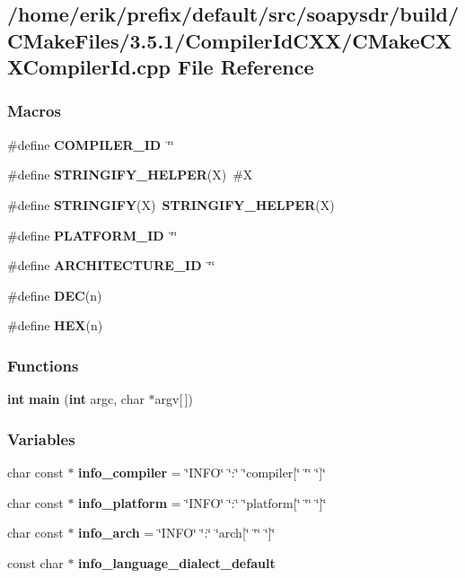 \subsection{/home/erik/prefix/default/src/soapysdr/build/\+C\+Make\+Files/3.5.1/\+Compiler\+Id\+C\+X\+X/\+C\+Make\+C\+X\+X\+Compiler\+Id.cpp File Reference}
\label{soapysdr_2build_2CMakeFiles_23_85_81_2CompilerIdCXX_2CMakeCXXCompilerId_8cpp}
\subsubsection*{Macros}
\begin{DoxyCompactItemize}
\item 
\#define {\bf C\+O\+M\+P\+I\+L\+E\+R\+\_\+\+ID}~\char`\"{}\char`\"{}
\item 
\#define {\bf S\+T\+R\+I\+N\+G\+I\+F\+Y\+\_\+\+H\+E\+L\+P\+ER}(X)~\#X
\item 
\#define {\bf S\+T\+R\+I\+N\+G\+I\+FY}(X)~{\bf S\+T\+R\+I\+N\+G\+I\+F\+Y\+\_\+\+H\+E\+L\+P\+ER}(X)
\item 
\#define {\bf P\+L\+A\+T\+F\+O\+R\+M\+\_\+\+ID}~\char`\"{}\char`\"{}
\item 
\#define {\bf A\+R\+C\+H\+I\+T\+E\+C\+T\+U\+R\+E\+\_\+\+ID}~\char`\"{}\char`\"{}
\item 
\#define {\bf D\+EC}(n)
\item 
\#define {\bf H\+EX}(n)
\end{DoxyCompactItemize}
\subsubsection*{Functions}
\begin{DoxyCompactItemize}
\item 
{\bf int} {\bf main} ({\bf int} argc, char $\ast$argv[$\,$])
\end{DoxyCompactItemize}
\subsubsection*{Variables}
\begin{DoxyCompactItemize}
\item 
char const $\ast$ {\bf info\+\_\+compiler} = \char`\"{}I\+N\+FO\char`\"{} \char`\"{}\+:\char`\"{} \char`\"{}compiler[\char`\"{} \char`\"{}\char`\"{} \char`\"{}]\char`\"{}
\item 
char const $\ast$ {\bf info\+\_\+platform} = \char`\"{}I\+N\+FO\char`\"{} \char`\"{}\+:\char`\"{} \char`\"{}platform[\char`\"{} \char`\"{}\char`\"{} \char`\"{}]\char`\"{}
\item 
char const $\ast$ {\bf info\+\_\+arch} = \char`\"{}I\+N\+FO\char`\"{} \char`\"{}\+:\char`\"{} \char`\"{}arch[\char`\"{} \char`\"{}\char`\"{} \char`\"{}]\char`\"{}
\item 
const char $\ast$ {\bf info\+\_\+language\+\_\+dialect\+\_\+default}
\end{DoxyCompactItemize}


